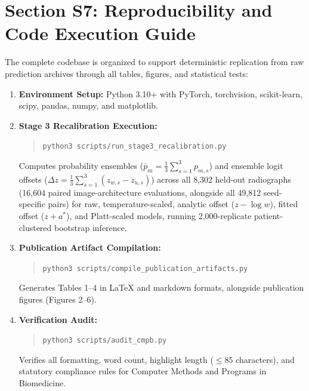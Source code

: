 \documentclass[preprint,12pt]{elsarticle}
\begin{document}
\section*{Section S7: Reproducibility and Code Execution Guide}
The complete codebase is organized to support deterministic replication from raw prediction archives through all tables, figures, and statistical tests:
\begin{enumerate}
    \item \textbf{Environment Setup:} Python 3.10+ with PyTorch, torchvision, scikit-learn, scipy, pandas, numpy, and matplotlib.
    \item \textbf{Stage 3 Recalibration Execution:}
    \begin{quote}
    \texttt{python3 scripts/run\_stage3\_recalibration.py}
    \end{quote}
    Computes probability ensembles ($\bar{p}_m = \frac{1}{3}\sum_{s=1}^3 p_{m,s}$) and ensemble logit offsets ($\Delta z = \frac{1}{3}\sum_{s=1}^3 (z_{w,s} - z_{u,s})$) across all 8,302 held-out radiographs (16,604 paired image-architecture evaluations, alongside all 49,812 seed-specific pairs) for raw, temperature-scaled, analytic offset ($z - \log w$), fitted offset ($z + a^*$), and Platt-scaled models, running 2,000-replicate patient-clustered bootstrap inference.
    \item \textbf{Publication Artifact Compilation:}
    \begin{quote}
    \texttt{python3 scripts/compile\_publication\_artifacts.py}
    \end{quote}
    Generates Tables 1--4 in LaTeX and markdown formats, alongside publication figures (Figures 2--6).
    \item \textbf{Verification Audit:}
    \begin{quote}
    \texttt{python3 scripts/audit\_cmpb.py}
    \end{quote}
    Verifies all formatting, word count, highlight length ($\le 85$ characters), and statutory compliance rules for Computer Methods and Programs in Biomedicine.
\end{enumerate}
\end{document}
